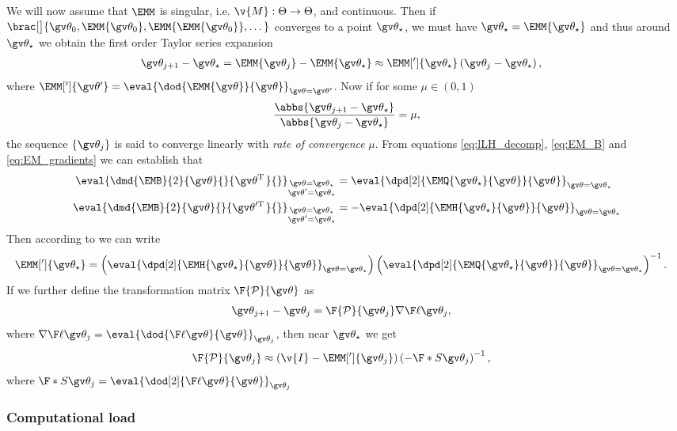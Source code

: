 We will now assume that $\EMM$ is singular, i.e.
$\v{M}:\Theta\to\Theta$, and continuous. Then if $\brac[\big]{\Th_0,\EMM{\Th_0},\EMM{\EMM{\Th_0}},\dots }$
converges to a point $\Th_\star$, we must have $\Th_\star=\EMM{\Th_\star}$ and
thus around $\Th_\star$ we obtain the first order Taylor series expansion
\begin{align}
	\Th_{j+1}-\Th_\star&=\EMM{\Th_j}-\EMM{\Th_\star}\approx\EMM[']{\Th_\star}\left(\Th_j-\Th_\star\right),
\end{align} 
where $\EMM[']{\Th'}=\eval{\dod{\EMM{\Th}}{\Th}}_{\Th=\Th'}$.
Now if for some $\mu\in\left(0,1\right)$ 
\begin{align}
	\frac{\abbs{\Th_{j+1}-\Th_\star}}{\abbs{\Th_{j}-\Th_\star}}=\mu,
\end{align}
the sequence $\left\{\Th_j\right\}$ is said to converge linearly with 
\emph{rate of convergence} $\mu$.
From equations \eqref{eq:lLH_decomp}, \eqref{eq:EM_B} and \eqref{eq:EM_gradients} we can establish that
\begin{align}
	\eval{\dmd{\EMB}{2}{\Th}{}{\left.\mkern-2mu\Th^\tr\right.}{}}_{\substack{\Th=\Th_\star\\ \Th'=\Th_\star}}&=\eval{\dpd[2]{ \EMQ{\Th_\star}{\Th}}{\Th}}_{\Th=\Th_\star}\\	
	\eval{\dmd{\EMB}{2}{\Th}{}{\left.\mkern-2mu\Th'^\tr\right.}{}}_{\substack{\Th=\Th_\star\\ \Th'=\Th_\star}}&=-\eval{\dpd[2]{ \EMH{\Th_\star}{\Th}}{\Th}}_{\Th=\Th_\star}\\	
\end{align}
Then according to \textcite{Salakhutdinov2003} we can write
\begin{align}
	\EMM[']{\Th_\star}&=\left(\eval{\dpd[2]{ \EMH{\Th_\star}{\Th}}{\Th}}_{\Th=\Th_\star}\right)
	\left(\eval{\dpd[2]{ \EMQ{\Th_\star}{\Th}}{\Th}}_{\Th=\Th_\star}\right)^{-1}.
	\label{eq:EM_M'}
\end{align}
If we further define the transformation matrix $\F{\mathcal P}{\Th}$ as
\begin{align}
	\Th_{j+1}-\Th_j &= \F{\mathcal P}{\Th_j}\nabla\lLH[\Th_j],
	\label{eq:EM_Pl}
\end{align}
where $\nabla\lLH[\Th_j]=\eval{\dod{\lLH}{\Th}}_{\Th_j}$, then near $\Th_\star$
we get
\begin{align}
		\F{\mathcal P}{\Th_j}&\approx \left(\v{I}-\EMM[']{\Th_j}\right)\left(-\F*{S}{\Th_j}\right)^{-1},
\end{align}
where $\F*{S}{\Th_j}=\eval{\dod[2]{\lLH}{\Th}}_{\Th_j}$





\parencite{Wu1983,Sandell1978,Meng1997,Elliott1999,Salakhutdinov2003a,Salakhutdinov2003,Olsson2007,Paninski2010}

\subsubsection{Computational load}

\parencite{Harvey1990,Watson1983,Cappe2005,Saatci2011,Olsson2007,Salakhutdinov2003a}


